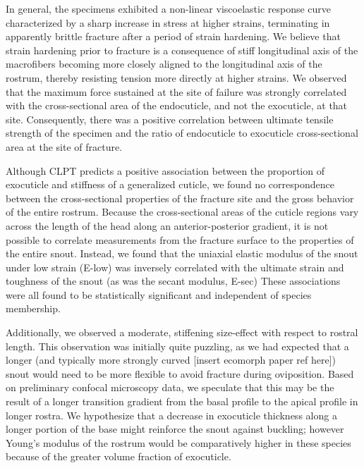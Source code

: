 \documentclass[twocolumn, linenumbers, superscriptaddress]{revtex4-1}
\begin{document}
		In general, the specimens exhibited a non-linear viscoelastic response curve characterized by a sharp increase in stress at higher strains, terminating in apparently brittle fracture after a period of strain hardening.
		We believe that strain hardening prior to fracture is a consequence of stiff longitudinal axis of the macrofibers becoming more closely aligned to the longitudinal axis of the rostrum, thereby resisting tension more directly at higher strains.
		We observed that the maximum force sustained at the site of failure was strongly correlated with the cross-sectional area of the endocuticle, and not the exocuticle, at that site.
		Consequently, there was a positive correlation between ultimate tensile strength of the specimen and the ratio of endocuticle to exocuticle cross-sectional area at the site of fracture.
		
		Although CLPT predicts a positive association between the proportion of exocuticle and stiffness of a generalized cuticle, we found no correspondence between the cross-sectional properties of the fracture site and the gross behavior of the entire rostrum.
		Because the cross-sectional areas of the cuticle regions vary across the length of the head along an anterior-posterior gradient, it is not possible to correlate measurements from the fracture surface to the properties of the entire snout.
		Instead, we found that the uniaxial elastic modulus of the snout under low strain (E-low) was inversely correlated with the ultimate strain and toughness of the snout (as was the secant modulus, E-sec)
		These associations were all found to be statistically significant and independent of species membership.
		
		Additionally, we observed a moderate, stiffening size-effect with respect to rostral length.
		This observation was initially quite puzzling, as we had expected that a longer (and typically more strongly curved [insert ecomorph paper ref here]) snout would need to be more flexible to avoid fracture during oviposition.
		Based on preliminary confocal microscopy data, we speculate that this may be the result of a longer transition gradient from the basal profile to the apical profile in longer rostra.
		We hypothesize that a decrease in exocuticle thickness along a longer portion of the base might reinforce the snout against buckling; however Young's modulus of the rostrum would be comparatively higher in these species because of the greater volume fraction of exocuticle.
		
\end{document}

